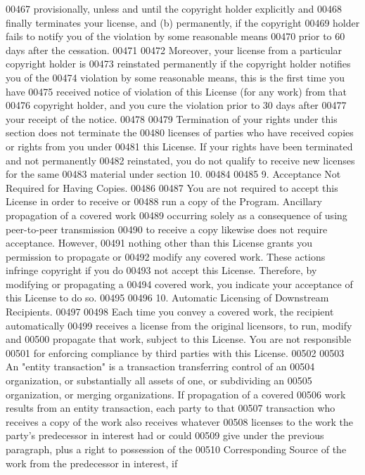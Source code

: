 \begin{DoxyCode}
00467 provisionally, unless and until the copyright holder explicitly and
00468 finally terminates your license, and (b) permanently, if the copyright
00469 holder fails to notify you of the violation by some reasonable means
00470 prior to 60 days after the cessation.
00471 
00472   Moreover, your license from a particular copyright holder is
00473 reinstated permanently if the copyright holder notifies you of the
00474 violation by some reasonable means, this is the first time you have
00475 received notice of violation of this License (for any work) from that
00476 copyright holder, and you cure the violation prior to 30 days after
00477 your receipt of the notice.
00478 
00479   Termination of your rights under this section does not terminate the
00480 licenses of parties who have received copies or rights from you under
00481 this License.  If your rights have been terminated and not permanently
00482 reinstated, you do not qualify to receive new licenses for the same
00483 material under section 10.
00484 
00485   9. Acceptance Not Required for Having Copies.
00486 
00487   You are not required to accept this License in order to receive or
00488 run a copy of the Program.  Ancillary propagation of a covered work
00489 occurring solely as a consequence of using peer-to-peer transmission
00490 to receive a copy likewise does not require acceptance.  However,
00491 nothing other than this License grants you permission to propagate or
00492 modify any covered work.  These actions infringe copyright if you do
00493 not accept this License.  Therefore, by modifying or propagating a
00494 covered work, you indicate your acceptance of this License to do so.
00495 
00496   10. Automatic Licensing of Downstream Recipients.
00497 
00498   Each time you convey a covered work, the recipient automatically
00499 receives a license from the original licensors, to run, modify and
00500 propagate that work, subject to this License.  You are not responsible
00501 for enforcing compliance by third parties with this License.
00502 
00503   An "entity transaction" is a transaction transferring control of an
00504 organization, or substantially all assets of one, or subdividing an
00505 organization, or merging organizations.  If propagation of a covered
00506 work results from an entity transaction, each party to that
00507 transaction who receives a copy of the work also receives whatever
00508 licenses to the work the party's predecessor in interest had or could
00509 give under the previous paragraph, plus a right to possession of the
00510 Corresponding Source of the work from the predecessor in interest, if

\end{DoxyCode}
